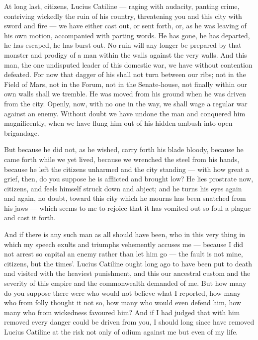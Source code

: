 
 At long last, citizens, Lucius Catiline --- raging with audacity, panting crime, contriving wickedly the ruin of his country, threatening you and this city with sword and fire --- we have either cast out, or sent forth, or, as he was leaving of his own motion, accompanied with parting words. He has gone, he has departed, he has escaped, he has burst out. No ruin will any longer be prepared by that monster and prodigy of a man within the walls against the very walls. And this man, the one undisputed leader of this domestic war, we have without contention defeated. For now that dagger of his shall not turn between our ribs; not in the Field of Mars, not in the Forum, not in the Senate-house, not finally within our own walls shall we tremble. He was moved from his ground when he was driven from the city. Openly, now, with no one in the way, we shall wage a regular war against an enemy. Without doubt we have undone the man and conquered him magnificently, when we have flung him out of his hidden ambush into open brigandage.

 But because he did not, as he wished, carry forth his blade bloody, because he came forth while we yet lived, because we wrenched the steel from his hands, because he left the citizens unharmed and the city standing --- with how great a grief, then, do you suppose he is afflicted and brought low? He lies prostrate now, citizens, and feels himself struck down and abject; and he turns his eyes again and again, no doubt, toward this city which he mourns has been snatched from his jaws --- which seems to me to rejoice that it has vomited out so foul a plague and cast it forth.

 And if there is any such man as all should have been, who in this very thing in which my speech exults and triumphs vehemently accuses me --- because I did not arrest so capital an enemy rather than let him go --- the fault is not mine, citizens, but the times'. Lucius Catiline ought long ago to have been put to death and visited with the heaviest punishment, and this our ancestral custom and the severity of this empire and the commonwealth demanded of me. But how many do you suppose there were who would not believe what I reported, how many who from folly thought it not so, how many who would even defend him, how many who from wickedness favoured him? And if I had judged that with him removed every danger could be driven from you, I should long since have removed Lucius Catiline at the risk not only of odium against me but even of my life.

